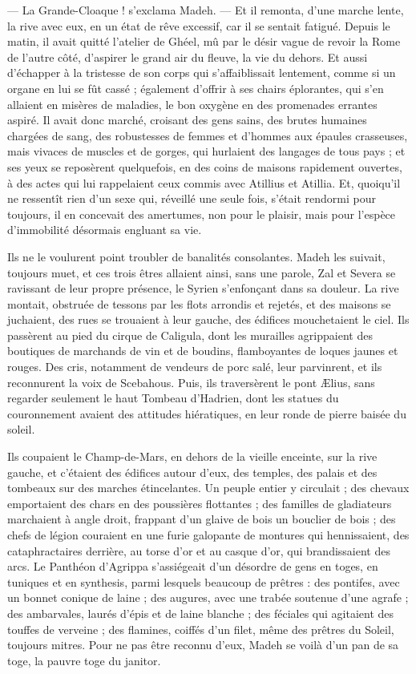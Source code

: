 \documentclass[a4paper, 11pt, oneside, polutonikogreek, french]{article}
\begin{document}
--- La Grande-Cloaque ! s'exclama Madeh. --- Et il remonta, d'une marche lente, la rive avec eux, en un état de rêve excessif, car il se sentait fatigué. Depuis le matin, il avait quitté l'atelier de Ghéel, mû par le désir vague de revoir la Rome de l'autre côté, d'aspirer le grand air du fleuve, la vie du dehors. Et aussi d'échapper à la tristesse de son corps qui s'affaiblissait lentement, comme si un organe en lui se fût cassé ; également d'offrir à ses chairs éplorantes, qui s'en allaient en misères de maladies, le bon oxygène en des promenades errantes aspiré. Il avait donc marché, croisant des gens sains, des brutes humaines chargées de sang, des robustesses de femmes et d'hommes aux épaules crasseuses, mais vivaces de muscles et de gorges, qui hurlaient des langages de tous pays ; et ses yeux se reposèrent quelquefois, en des coins de maisons rapidement ouvertes, à des actes qui lui rappelaient ceux commis avec Atillius et Atillia. Et, quoiqu'il ne ressentît rien d'un sexe qui, réveillé une seule fois, s'était rendormi pour toujours, il en concevait des amertumes, non pour le plaisir, mais pour l'espèce d'immobilité désormais engluant sa vie.

Ils ne le voulurent point troubler de banalités consolantes. Madeh les suivait, toujours muet, et ces trois êtres allaient ainsi, sans une parole, Zal et Severa se ravissant de leur propre présence, le Syrien s'enfonçant dans sa douleur. La rive montait, obstruée de tessons par les flots arrondis et rejetés, et des maisons se juchaient, des rues se trouaient à leur gauche, des édifices mouchetaient le ciel. Ils passèrent au pied du cirque de Caligula, dont les murailles agrippaient des boutiques de marchands de vin et de boudins, flamboyantes de loques jaunes et rouges. Des cris, notamment de vendeurs de porc salé, leur parvinrent, et ils reconnurent la voix de Scebahous. Puis, ils traversèrent le pont Ælius, sans regarder seulement le haut Tombeau d'Hadrien, dont les statues du couronnement avaient des attitudes hiératiques, en leur ronde de pierre baisée du soleil.

Ils coupaient le Champ-de-Mars, en dehors de la vieille enceinte, sur la rive gauche, et c'étaient des édifices autour d'eux, des temples, des palais et des tombeaux sur des marches étincelantes. Un peuple entier y circulait ; des chevaux emportaient des chars en des poussières flottantes ; des familles de gladiateurs marchaient à angle droit, frappant d'un glaive de bois un bouclier de bois ; des chefs de légion couraient en une furie galopante de montures qui hennissaient, des cataphractaires derrière, au torse d'or et au casque d'or, qui brandissaient des arcs. Le Panthéon d'Agrippa s'assiégeait d'un désordre de gens en toges, en tuniques et en synthesis, parmi lesquels beaucoup de prêtres : des pontifes, avec un bonnet conique de laine ; des augures, avec une trabée soutenue d'une agrafe ; des ambarvales, laurés d'épis et de laine blanche ; des féciales qui agitaient des touffes de verveine ; des flamines, coiffés d'un filet, même des prêtres du Soleil, toujours mitres. Pour ne pas être reconnu d'eux, Madeh se voilà d'un pan de sa toge, la pauvre toge du janitor.
\end{document}
